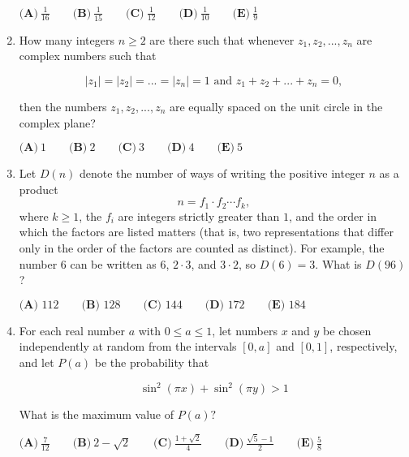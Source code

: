 \documentclass{article}
\begin{document}
\begin{enumerate}[label=\arabic*., itemsep=0.5em]
\(\textbf{(A)}\ \frac{1}{16} \qquad\textbf{(B)}\ \frac{1}{15} \qquad\textbf{(C)}\ \frac{1}{12} \qquad\textbf{(D)}\ \frac{1}{10} \qquad\textbf{(E)}\ \frac{1}{9}\)\par \vspace{0.5em}\item How many integers \(n \geq 2\) are there such that whenever \(z_1, z_2, ..., z_n\) are complex numbers such that


\begin{equation*}
|z_1| = |z_2| = ... = |z_n| = 1 \text{    and    } z_1 + z_2 + ... + z_n = 0,
\end{equation*}

then the numbers \(z_1, z_2, ..., z_n\) are equally spaced on the unit circle in the complex plane?

\(\textbf{(A)}\ 1 \qquad\textbf{(B)}\ 2 \qquad\textbf{(C)}\ 3 \qquad\textbf{(D)}\ 4 \qquad\textbf{(E)}\ 5\)\par \vspace{0.5em}\item Let \(D(n)\) denote the number of ways of writing the positive integer \(n\) as a product
\begin{equation*}
n = f_1\cdot f_2\cdots f_k,
\end{equation*}
where \(k\ge1\), the \(f_i\) are integers strictly greater than \(1\), and the order in which the factors are listed matters (that is, two representations that differ only in the order of the factors are counted as distinct). For example, the number \(6\) can be written as \(6\), \(2\cdot 3\), and \(3\cdot2\), so \(D(6) = 3\). What is \(D(96)\)?

\(\textbf{(A) } 112 \qquad\textbf{(B) } 128 \qquad\textbf{(C) } 144 \qquad\textbf{(D) } 172 \qquad\textbf{(E) } 184\)\par \vspace{0.5em}\item For each real number \(a\) with \(0 \leq a \leq 1\), let numbers \(x\) and \(y\) be chosen independently at random from the intervals \([0, a]\) and \([0, 1]\), respectively, and let \(P(a)\) be the probability that


\begin{equation*}
\sin^2{(\pi x)} + \sin^2{(\pi y)} > 1
\end{equation*}

What is the maximum value of \(P(a)?\)

\(\textbf{(A)}\ \frac{7}{12} \qquad\textbf{(B)}\ 2 - \sqrt{2} \qquad\textbf{(C)}\ \frac{1+\sqrt{2}}{4} \qquad\textbf{(D)}\ \frac{\sqrt{5}-1}{2} \qquad\textbf{(E)}\ \frac{5}{8}\)\par \vspace{0.5em}\end{enumerate}
\end{document}
